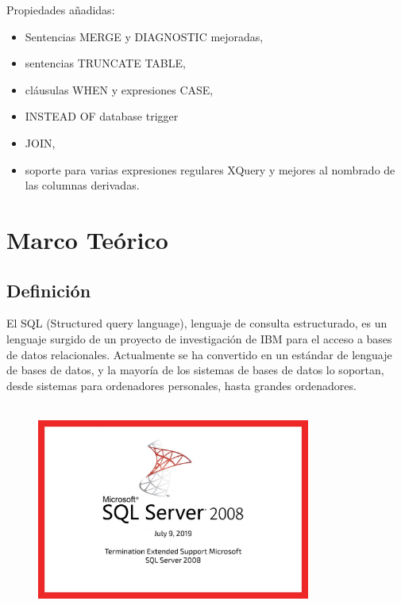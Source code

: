 \documentclass[preprint,12pt]{elsarticle}
\begin{document}
Propiedades añadidas:
\begin{itemize}
\item Sentencias MERGE y DIAGNOSTIC mejoradas,
\item sentencias TRUNCATE TABLE,
\item cláusulas WHEN y expresiones CASE,
\item INSTEAD OF database trigger
\item JOIN,
\item soporte para varias expresiones regulares XQuery y
mejores al nombrado de las columnas derivadas.
\end{itemize}

\section{Marco Teórico}

\subsection{Definición}
El SQL (Structured query language), lenguaje de consulta estructurado, es un lenguaje surgido de un proyecto de investigación de IBM para el acceso a bases de datos relacionales. Actualmente se ha convertido en un estándar  de lenguaje de bases de datos, y la mayoría de los sistemas de bases de datos lo soportan, desde sistemas para ordenadores personales, hasta grandes ordenadores.\cite{DWarehouse02}
\\
\\

\begin{figure}[htb]
				\begin{center}
					\includegraphics[width=9cm]{./IMAGENES/definicionsql}
				\end{center}
			\end{figure}
\end{document}
